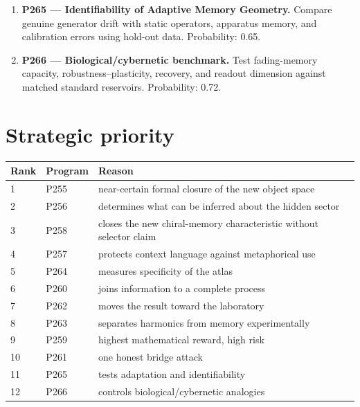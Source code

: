 \documentclass[11pt,a4paper,openany]{report}
\begin{document}
\begin{enumerate}
\item 
\textbf{P265 --- Identifiability of Adaptive Memory Geometry.} Compare genuine generator drift with static operators, apparatus memory, and calibration errors using hold-out data. Probability: 0.65.

\item 
\textbf{P266 --- Biological/\allowbreak{}cybernetic benchmark.} Test fading-memory capacity, robustness--plasticity, recovery, and readout dimension against matched standard reservoirs. Probability: 0.72.

\end{enumerate}

\chapter{Strategic priority}

\begin{center}
\begingroup\small
\setlength{\tabcolsep}{2.5pt}
\renewcommand{\arraystretch}{1.16}
\begin{longtable}{@{}p{}p{}p{}@{}}
\toprule
\textbf{Rank} & \textbf{Program} & \textbf{Reason} \\
\midrule
\endhead
1 & P255 & near-certain formal closure of the new object space \\
2 & P256 & determines what can be inferred about the hidden sector \\
3 & P258 & closes the new chiral-memory characteristic without selector claim \\
4 & P257 & protects context language against metaphorical use \\
5 & P264 & measures specificity of the atlas \\
6 & P260 & joins information to a complete process \\
7 & P262 & moves the result toward the laboratory \\
8 & P263 & separates harmonics from memory experimentally \\
9 & P259 & highest mathematical reward, high risk \\
10 & P261 & one honest bridge attack \\
11 & P265 & tests adaptation and identifiability \\
12 & P266 & controls biological/\allowbreak{}cybernetic analogies \\
\bottomrule
\end{longtable}
\endgroup
\end{center}
\end{document}
